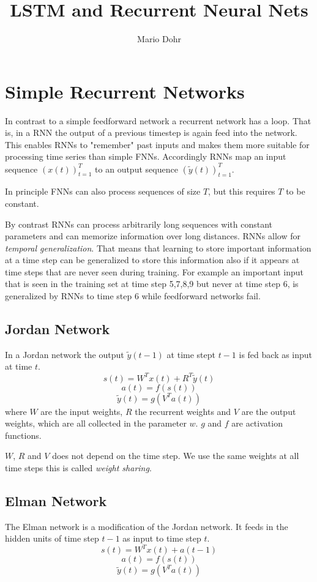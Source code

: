 \documentclass[10pt,a4paper]{article}
\author{Mario Dohr}
\title{LSTM and Recurrent Neural Nets}
\begin{document}
\maketitle
\section{Simple Recurrent Networks}
In contrast to a simple feedforward network a recurrent network has a loop. That is, in a RNN the output of a previous timestep is again feed into the network. This enables RNNs to "remember" past inputs and makes them more suitable for processing time series than simple FNNs. 
Accordingly RNNs map an input sequence $(x(t))_{t=1}^T$ to an output sequence $(\tilde{y}(t))_{t=1}^T$.

In principle FNNs can also process sequences of size $T$, but this requires $T$ to be constant. 

By contrast RNNs can process arbitrarily long sequences with constant parameters and can memorize information over long distances. RNNs allow for \textit{temporal generalization}. That means that learning to store important information at a time step can be generalized to store this information also if it appears at  time steps that are never seen during training. For example an important input that is seen in the training set at time step 5,7,8,9 but never at time step 6, is generalized by RNNs to time step 6 while feedforward networks fail.

\subsection{Jordan Network}
In a Jordan network the output $\tilde{y}(t-1)$ at time stept $t-1$ is fed back as input at time $t$.
\[ s(t) = W^T x(t) + R^T \tilde{y}(t) \]
\[ a(t) = f(s(t)) \]
\[ \tilde{y}(t) = g(V^T a(t)) \]
where $W$ are the input weights, $R$ the recurrent weights and $V$ are the output weights, which are all collected in the parameter $w$. 
$g$ and $f$ are activation functions.

$W$, $R$ and $V$ does not depend on the time step. We use the same weights at all time steps this is called
\textit{weight sharing}.

\subsection{Elman Network}
The Elman network is a modification of the Jordan network. It feeds in the hidden units of time step $t-1$ as input to time step $t$. 
\[ s(t) = W^T x(t) + a(t-1) \]
\[ a(t) = f(s(t)) \]
\[ \tilde{y}(t) = g(V^T a(t)) \]
\end{document}

